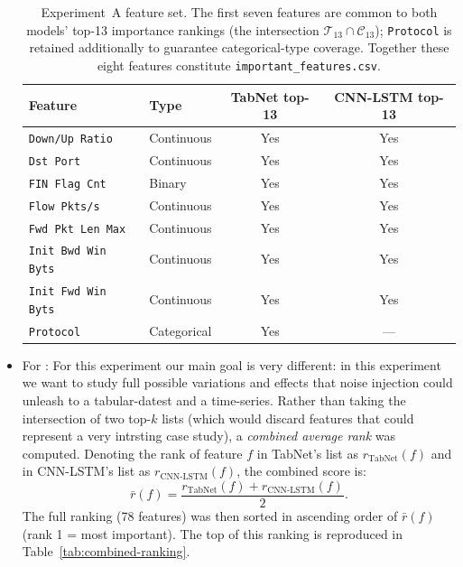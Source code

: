 \documentclass[../main.tex]{subfiles}
\begin{document}
\begin{itemize}
    \begin{table}[H]
        \centering
        \caption{Experiment~A feature set. The first seven features are common to both models' top-13 importance rankings (the intersection $\mathcal{T}_{13} \cap \mathcal{C}_{13}$); \texttt{Protocol} is retained additionally to guarantee categorical-type coverage. Together these eight features constitute \texttt{important\_features.csv}.}
        \label{tab:selected-features-ranking}
        \small
        \begin{tabular}{llcc}
        \toprule
        \textbf{Feature}     & \textbf{Type}  & \textbf{TabNet top-13} & \textbf{CNN-LSTM top-13} \\
        \midrule
        \texttt{Down/Up Ratio}      & Continuous   & Yes & Yes \\
        \texttt{Dst Port}           & Continuous   & Yes & Yes \\
        \texttt{FIN Flag Cnt}       & Binary       & Yes & Yes \\
        \texttt{Flow Pkts/s}        & Continuous   & Yes & Yes \\
        \texttt{Fwd Pkt Len Max}    & Continuous   & Yes & Yes \\
        \texttt{Init Bwd Win Byts}  & Continuous   & Yes & Yes \\
        \texttt{Init Fwd Win Byts}  & Continuous   & Yes & Yes \\
        \midrule
        \texttt{Protocol}           & Categorical  & Yes & —   \\
        \bottomrule
        \end{tabular}
    \end{table}

    \newpage
    \item For : For this experiment our main goal is very different: in this experiment we want to study full possible variations and effects that noise injection could unleash to a tabular-datest and a time-series. Rather than taking the intersection of two top-$k$ lists (which would discard features that could represent a very intrsting case study), a \emph{combined average rank} was computed.  Denoting the rank of feature $f$ in TabNet's list as $r_{\text{TabNet}}(f)$ and in CNN-LSTM's list as $r_{\text{CNN-LSTM}}(f)$, the combined score is:
    \[
        \bar{r}(f) = \frac{r_{\text{TabNet}}(f) + r_{\text{CNN-LSTM}}(f)}{2}.
    \]
    The full ranking (78 features) was then sorted in ascending order of $\bar{r}(f)$ (rank 1 = most important).  The top of this ranking is reproduced in Table~\ref{tab:combined-ranking}.
    

\end{itemize}
\end{document}
